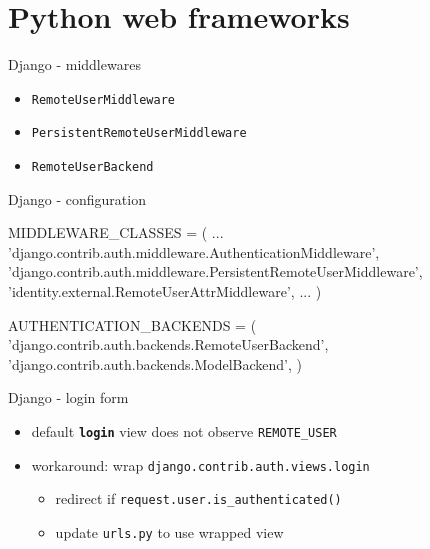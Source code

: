 \documentclass[ignorenonframetext,aspectratio=169]{beamer}
\newenvironment{Shaded}{}{}
\newcommand{\StringTok}[1]{\textcolor[rgb]{0.25,0.44,0.63}{{#1}}}
\newcommand{\OperatorTok}[1]{\textcolor[rgb]{0.40,0.40,0.40}{{#1}}}
\newcommand{\NormalTok}[1]{{#1}}
\providecommand{\tightlist}{%
  \setlength{\itemsep}{0pt}\setlength{\parskip}{0pt}}
\begin{document}
\section{Python web frameworks}

\begin{frame}{Django - middlewares}
\begin{itemize}
\tightlist

\item {\tt RemoteUserMiddleware}
\item {\tt PersistentRemoteUserMiddleware}
\item {\tt RemoteUserBackend}

\end{itemize}
\end{frame}

\begin{frame}[fragile]{Django - configuration}
\begin{Shaded}
\begin{Highlighting}[]
\NormalTok{MIDDLEWARE_CLASSES }\OperatorTok{=} \NormalTok{(}
 \NormalTok{...}
 \StringTok{'django.contrib.auth.middleware.AuthenticationMiddleware'}\NormalTok{,}
 \StringTok{'django.contrib.auth.middleware.PersistentRemoteUserMiddleware'}\NormalTok{,}
 \StringTok{'identity.external.RemoteUserAttrMiddleware'}\NormalTok{,}
 \NormalTok{...}
\NormalTok{)}

\NormalTok{AUTHENTICATION_BACKENDS }\OperatorTok{=} \NormalTok{(}
  \StringTok{'django.contrib.auth.backends.RemoteUserBackend'}\NormalTok{,}
  \StringTok{'django.contrib.auth.backends.ModelBackend'}\NormalTok{,}
\NormalTok{)}
\end{Highlighting}
\end{Shaded}
\end{frame}

\begin{frame}{Django - login form}
\begin{itemize}
\tightlist

\item default {\tt \textbf{login}} view does not observe {\tt REMOTE\_USER}

\item workaround: wrap {\tt django.contrib.auth.views.login}

    \begin{itemize}
    \tightlist
    \item redirect if {\tt request.user.is\_authenticated()}
    \item update {\tt urls.py} to use wrapped view
    \end{itemize}

\end{itemize}
\end{frame}
\end{document}
